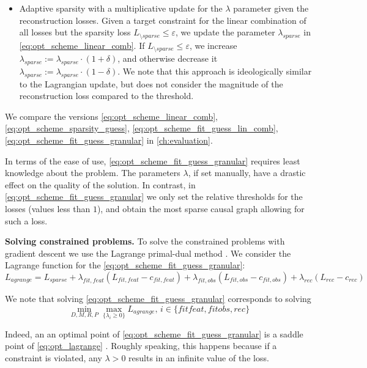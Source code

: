 \documentclass[a4paper,11pt,oneside]{report}
\begin{document}
\begin{itemize}
    \item Adaptive sparsity \cite{Dieleman2021} with a multiplicative update for the $\lambda$ parameter given the reconstruction losses. Given a target constraint for the linear combination of all losses but the sparsity loss $L_{\setminus sparse}\leq\varepsilon$, we update the parameter $\lambda_{sparse}$ in \autoref{eq:opt_scheme_linear_comb}. If $L_{\setminus sparse}\leq\varepsilon$, we increase $\lambda_{sparse}:=\lambda_{sparse}\cdot (1+\delta)$, and otherwise decrease it $\lambda_{sparse}:=\lambda_{sparse}\cdot (1-\delta)$. We note that this approach is ideologically similar to the Lagrangian update, but does not consider the magnitude of the reconstruction loss compared to the threshold.
\end{itemize}

We compare the versions \ref{eq:opt_scheme_linear_comb}, \ref{eq:opt_scheme_sparsity_guess}, \ref{eq:opt_scheme_fit_guess_lin_comb}, \ref{eq:opt_scheme_fit_guess_granular} in \autoref{ch:evaluation}.

In terms of the ease of use, \autoref{eq:opt_scheme_fit_guess_granular} requires least knowledge about the problem. The parameters $\lambda$, if set manually, have a drastic effect on the quality of the solution. In contrast, in \autoref{eq:opt_scheme_fit_guess_granular} we only set the relative thresholds for the losses (values less than $1$), and obtain the most sparse causal graph allowing for such a loss.

{\bf Solving constrained problems.} To solve the constrained problems with gradient descent we use the Lagrange primal-dual method \cite{Adegbege2021}. We consider the Lagrange function for the \autoref{eq:opt_scheme_fit_guess_granular}:
$$
L_{agrange}=L_{sparse}+\lambda_{fit, feat}(L_{fit, feat}-c_{fit, feat})+\lambda_{fit, obs}(L_{fit, obs}-c_{fit, obs})+\lambda_{rec}(L_{rec}-c_{rec})
$$

We note that solving \autoref{eq:opt_scheme_fit_guess_granular} corresponds to solving
\begin{equation}
\label{eq:opt_lagrange}
\min\limits_{D,M,R,P}\max\limits_{\{\lambda_i\geq 0\}}L_{agrange},\,i\in\{fitfeat, fitobs, rec\}
\end{equation}

Indeed, an an optimal point of \autoref{eq:opt_scheme_fit_guess_granular} is a saddle point of \autoref{eq:opt_lagrange} \cite{Franceschi2019}. Roughly speaking, this happens because if a constraint is violated, any $\lambda>0$ results in an infinite value of the loss.
\end{document}
